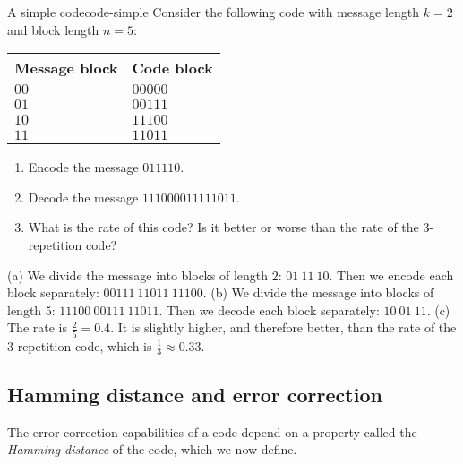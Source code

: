 \begin{example}{A simple code}{code-simple}
  Consider the following code with message length $k=2$ and block
  length $n=5$:
  \begin{center}
    \begin{tabular}{|l|l|}
      \hline
      Message block & Code block \\\hline
      $00$ & $00000$ \\
      $01$ & $00111$ \\
      $10$ & $11100$ \\
      $11$ & $11011$ \\\hline
    \end{tabular}
  \end{center}
  \begin{enumialphparenastyle}
    \begin{enumerate}
    \item Encode the message\/ $011110$.
    \item Decode the message\/ $111000011111011$.
    \item What is the rate of this code? Is it better or worse than
      the rate of the 3-repetition code?
    \end{enumerate}
  \end{enumialphparenastyle}
\end{example}

\begin{solution}
  (a) We divide the message into blocks of length $2$:
  $01~11~10$. Then we encode each block separately:
  $00111~11011~11100$. (b) We divide the message into blocks of length
  $5$: $11100~00111~11011$. Then we decode each block separately:
  $10~01~11$. (c) The rate is $\frac{2}{5}=0.4$. It is slightly
  higher, and therefore better, than the rate of the 3-repetition code,
  which is $\frac{1}{3}\approx 0.33$.
\end{solution}

\subsection*{Hamming distance and error correction}

The error correction capabilities of a code depend on a property
called the \textit{Hamming distance} of the code, which we now define.

